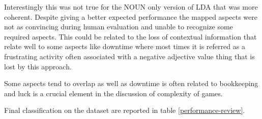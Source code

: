 Interestingly this was not true for the NOUN only version of LDA that was more coherent.
Despite giving a better expected performance the mapped aspects were not
as convincing during human evaluation and unable to recognize some required aspects.
This could be related to the loss of contextual information that relate well to
some aspects like downtime where most times it is referred as a frustrating activity
often associated with a negative adjective value thing that is lost by this approach.

Some aspects tend to overlap as well as downtime is often related to bookkeeping and
luck is a crucial element in the discussion of complexity of games.

Final classification on the dataset are reported in table \ref{performance-review}.
